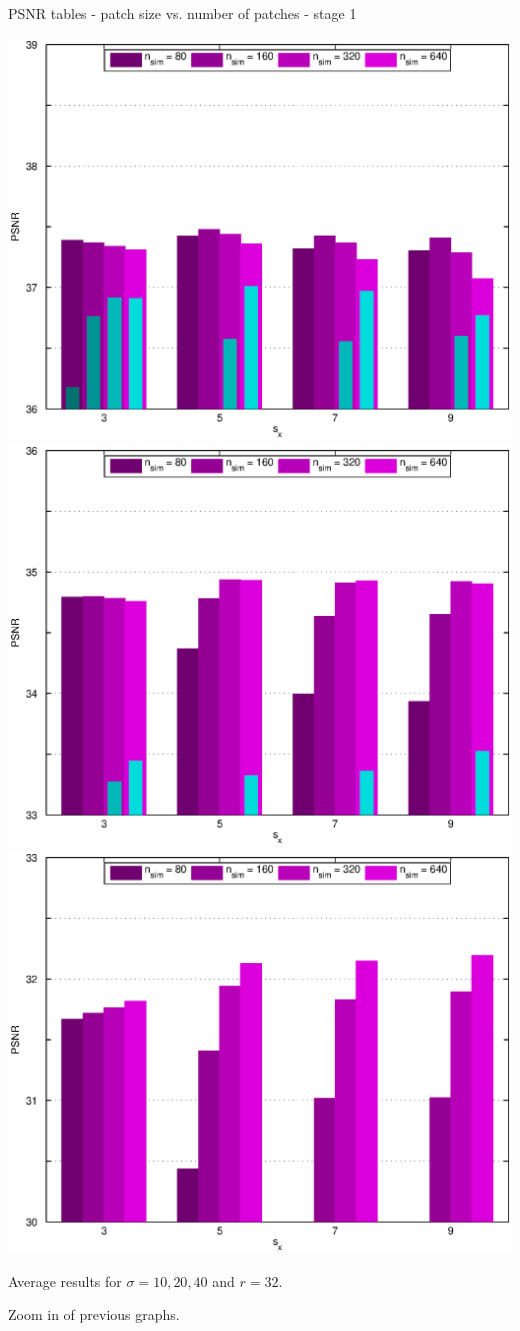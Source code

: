 \documentclass[mathserif, 8pt]{beamer}
\begin{document}
\begin{frame}{PSNR tables - patch size vs. number of patches - stage 1}
	\begin{center}
		\includegraphics[width=.33\textwidth]{zoom_psnr_px1-np1-bars_1r32_s10_average.eps}%
		\includegraphics[width=.33\textwidth]{zoom_psnr_px1-np1-bars_1r32_s20_average.eps}%
		\includegraphics[width=.33\textwidth]{zoom_psnr_px1-np1-bars_1r32_s40_average.eps}
	\end{center}
	\begin{center}
	Average results for $\sigma = 10, 20, 40$ and $r = 32$. 
	\bigskip
	
	Zoom in of previous graphs.
	\end{center}
\end{frame}
\end{document}
